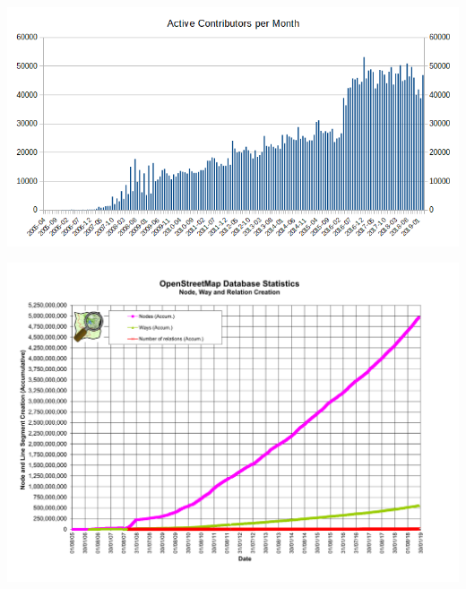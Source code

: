 \documentclass{beamer}
\begin{document}
	\begin{frame}
		\begin{center}
			\includegraphics[width=\textwidth,height=\textheight,keepaspectratio]{images/Active_contributors_month.png}
		\end{center}
	\end{frame}
	
	\begin{frame}
		\begin{center}
			\includegraphics[width=\textwidth,height=\textheight,keepaspectratio]{images/Osmdbstats2.png}
		\end{center}
	\end{frame}
	
\end{document}
